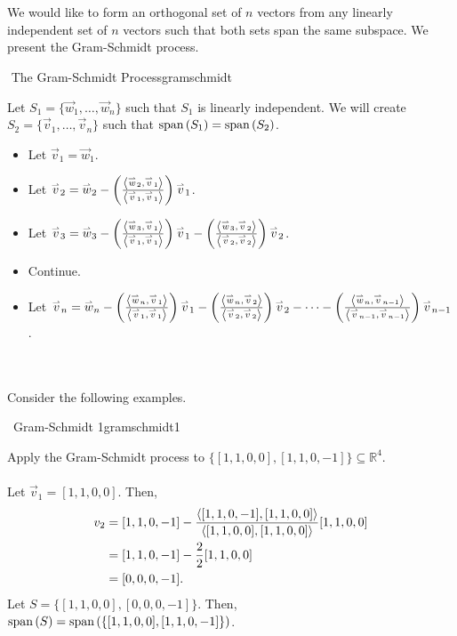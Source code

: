         \pagebreak
        \vphantom
        \\
        \\
        We would like to form an orthogonal set of \(n\) vectors from any linearly independent set of \(n\) vectors such that both sets span the same subspace. We present the Gram-Schmidt process.
        \begin{theorem}{\Stop\,\,The Gram-Schmidt Process}{gramschmidt}
            
            Let \(S_1=\{\vec{w}_1,\ldots,\vec{w}_n\}\) such that \(S_1\) is linearly independent. We will create \(S_2=\{\vec{v}_1,\ldots,\vec{v}_n\}\) such that \(\Span(S_1)=\Span(S_2)\).
            \begin{itemize}
                \item Let \(\vec{v}_1=\vec{w}_1\).
                \item Let \(\vec{v}_2=\vec{w}_2-\left(\frac{\iprod{\vec{w}_2}{\vec{v}_1}}{\iprod{\vec{v}_1}{\vec{v}_1}}\right)\vec{v}_1\).
                \item Let \(\vec{v}_3=\vec{w}_3-\left(\frac{\iprod{\vec{w}_3}{\vec{v}_1}}{\iprod{\vec{v}_1}{\vec{v}_1}}\right)\vec{v}_1-\left(\frac{\iprod{\vec{w}_3}{\vec{v}_2}}{\iprod{\vec{v}_2}{\vec{v}_2}}\right)\vec{v}_2\).
                \item Continue.
                \item Let \(\vec{v}_n=\vec{w}_n-\left(\frac{\iprod{\vec{w}_n}{\vec{v}_1}}{\iprod{\vec{v}_1}{\vec{v}_1}}\right)\vec{v}_1-\left(\frac{\iprod{\vec{w}_n}{\vec{v}_2}}{\iprod{\vec{v}_2}{\vec{v}_2}}\right)\vec{v}_2-\cdots-\left(\frac{\iprod{\vec{w}_n}{\vec{v}_{n-1}}}{\iprod{\vec{v}_{n-1}}{\vec{v}_{n-1}}}\right)\vec{v}_{n-1}\).
            \end{itemize}

        \end{theorem}
        \vphantom
        \\
        \\
        Consider the following examples.
        \begin{example}{\Difficulty\,\Difficulty\,\,Gram-Schmidt 1}{gramschmidt1}

            Apply the Gram-Schmidt process to \(\{[1,1,0,0],[1,1,0,-1]\}\subseteq\mathbb{R}^4\).
            \\
            \\
            Let \(\vec{v}_1=[1,1,0,0]\). Then,
            \begin{align*}
                v_2&=[1,1,0,-1]-\frac{\iprod{[1,1,0,-1]}{[1,1,0,0]}}{\iprod{[1,1,0,0]}{[1,1,0,0]}}[1,1,0,0] \\
                &=[1,1,0,-1]-\frac{2}{2}[1,1,0,0] \\
                &=[0,0,0,-1].
            \end{align*}
            Let \(S=\{[1,1,0,0],[0,0,0,-1]\}\). Then, \(\Span(S)=\Span(\{[1,1,0,0],[1,1,0,-1]\})\).
            
        \end{example}
